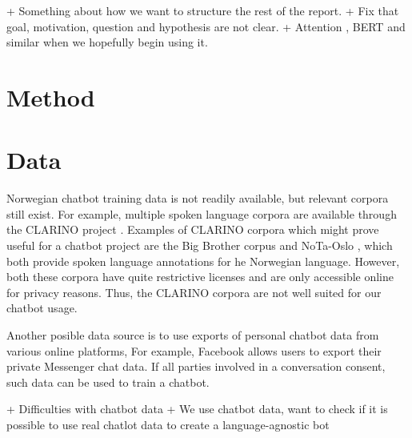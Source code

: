 \documentclass{article}
\begin{document}
+ Something about how we want to structure the rest of the report.
+ Fix that goal, motivation, question and hypothesis are not clear.
+ Attention \cite{Bahdanau2015}, BERT and similar when we hopefully begin using it.

\section{Method}


\section{Data}

Norwegian chatbot training data is not readily available, but relevant corpora still exist.
For example, multiple spoken language corpora are available through the CLARINO project
\cite{clarino-description}. Examples of CLARINO corpora which might prove useful for a chatbot
project are the Big Brother corpus \cite{clarino-bb} and NoTa-Oslo \cite{clarino-nota}, which
both provide spoken language annotations for he Norwegian language. However, both these corpora
have quite restrictive licenses and are only accessible online for privacy reasons. Thus, the
CLARINO corpora are not well suited for our chatbot usage.

Another posible data source is to use exports of personal chatbot data from various
online platforms, For example, Facebook allows users to export their private Messenger
chat data. If all parties involved in a conversation consent, such data can be used to
train a chatbot.

+ Difficulties with chatbot data
+ We use chatbot data, want to check if it is possible to use real chatlot data to create a language-agnostic bot
\end{document}
